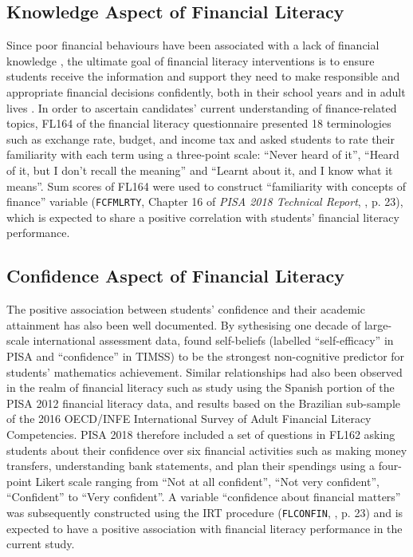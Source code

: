 \documentclass[a4paper,11pt,UKenglish,twoside,openright]{report}\usepackage[]{graphicx}\usepackage[]{color}
\begin{document}

\subsection{Knowledge Aspect of Financial Literacy}

Since poor financial behaviours have been associated with a lack of financial knowledge \parencite{hastings:2013, lusardi:2014}, the ultimate goal of financial literacy interventions is to ensure students receive the information and support they need to make responsible and appropriate financial decisions confidently, both in their school years and in adult lives \parencite{PISAvol4}. In order to ascertain candidates' current understanding of finance-related topics, \textsf{FL164} of the financial literacy questionnaire presented 18 terminologies such as exchange rate, budget, and income tax and asked students to rate their familiarity with each term using a three-point scale: ``Never heard of it'', ``Heard of it, but I don't recall the meaning'' and ``Learnt about it, and I know what it means''. Sum scores of \textsf{FL164} were used to construct ``familiarity with concepts of finance'' variable (\texttt{FCFMLRTY}, Chapter 16 of \textit{PISA 2018 Technical Report}, \textcite{PISAtech}, p. 23), which is expected to share a positive correlation with students' financial literacy performance.

\subsection{Confidence Aspect of Financial Literacy}

The positive association between students' confidence and their academic attainment has also been well documented. By sythesising one decade of large-scale international assessment data, \textcite{lee:2018} found self-beliefs (labelled ``self-efficacy'' in PISA and ``confidence'' in TIMSS) to be the strongest non-cognitive predictor for students' mathematics achievement. Similar relationships had also been observed in the realm of financial literacy such as  study using the Spanish portion of the PISA 2012 financial literacy data, and  results based on the Brazilian sub-sample of the 2016 OECD/INFE International Survey of Adult Financial Literacy Competencies. PISA 2018 therefore included a set of questions in \textsf{FL162} asking students about their confidence over six financial activities such as making money transfers, understanding bank statements, and plan their spendings using a four-point Likert scale ranging from ``Not at all confident'', ``Not very confident'', ``Confident'' to ``Very confident''. A variable ``confidence about financial matters'' was subsequently constructed using the IRT procedure (\texttt{FLCONFIN}, \textcite{PISAtech}, p. 23) and is expected to have a positive association with financial literacy performance in the current study.
\end{document}
